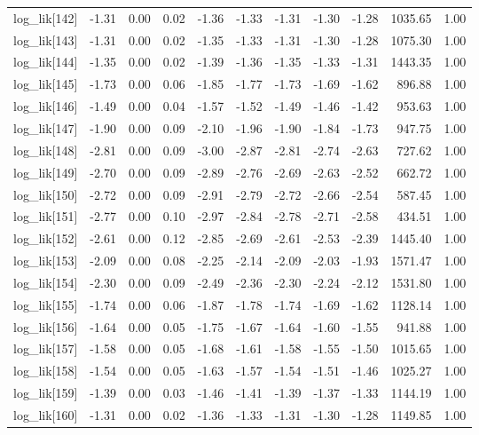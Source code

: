 \begin{table}[ht]
\begin{tabular}{rrrrrrrrrrr}
  log\_lik[142] & -1.31 & 0.00 & 0.02 & -1.36 & -1.33 & -1.31 & -1.30 & -1.28 & 1035.65 & 1.00 \\ 
  log\_lik[143] & -1.31 & 0.00 & 0.02 & -1.35 & -1.33 & -1.31 & -1.30 & -1.28 & 1075.30 & 1.00 \\ 
  log\_lik[144] & -1.35 & 0.00 & 0.02 & -1.39 & -1.36 & -1.35 & -1.33 & -1.31 & 1443.35 & 1.00 \\ 
  log\_lik[145] & -1.73 & 0.00 & 0.06 & -1.85 & -1.77 & -1.73 & -1.69 & -1.62 & 896.88 & 1.00 \\ 
  log\_lik[146] & -1.49 & 0.00 & 0.04 & -1.57 & -1.52 & -1.49 & -1.46 & -1.42 & 953.63 & 1.00 \\ 
  log\_lik[147] & -1.90 & 0.00 & 0.09 & -2.10 & -1.96 & -1.90 & -1.84 & -1.73 & 947.75 & 1.00 \\ 
  log\_lik[148] & -2.81 & 0.00 & 0.09 & -3.00 & -2.87 & -2.81 & -2.74 & -2.63 & 727.62 & 1.00 \\ 
  log\_lik[149] & -2.70 & 0.00 & 0.09 & -2.89 & -2.76 & -2.69 & -2.63 & -2.52 & 662.72 & 1.00 \\ 
  log\_lik[150] & -2.72 & 0.00 & 0.09 & -2.91 & -2.79 & -2.72 & -2.66 & -2.54 & 587.45 & 1.00 \\ 
  log\_lik[151] & -2.77 & 0.00 & 0.10 & -2.97 & -2.84 & -2.78 & -2.71 & -2.58 & 434.51 & 1.00 \\ 
  log\_lik[152] & -2.61 & 0.00 & 0.12 & -2.85 & -2.69 & -2.61 & -2.53 & -2.39 & 1445.40 & 1.00 \\ 
  log\_lik[153] & -2.09 & 0.00 & 0.08 & -2.25 & -2.14 & -2.09 & -2.03 & -1.93 & 1571.47 & 1.00 \\ 
  log\_lik[154] & -2.30 & 0.00 & 0.09 & -2.49 & -2.36 & -2.30 & -2.24 & -2.12 & 1531.80 & 1.00 \\ 
  log\_lik[155] & -1.74 & 0.00 & 0.06 & -1.87 & -1.78 & -1.74 & -1.69 & -1.62 & 1128.14 & 1.00 \\ 
  log\_lik[156] & -1.64 & 0.00 & 0.05 & -1.75 & -1.67 & -1.64 & -1.60 & -1.55 & 941.88 & 1.00 \\ 
  log\_lik[157] & -1.58 & 0.00 & 0.05 & -1.68 & -1.61 & -1.58 & -1.55 & -1.50 & 1015.65 & 1.00 \\ 
  log\_lik[158] & -1.54 & 0.00 & 0.05 & -1.63 & -1.57 & -1.54 & -1.51 & -1.46 & 1025.27 & 1.00 \\ 
  log\_lik[159] & -1.39 & 0.00 & 0.03 & -1.46 & -1.41 & -1.39 & -1.37 & -1.33 & 1144.19 & 1.00 \\ 
  log\_lik[160] & -1.31 & 0.00 & 0.02 & -1.36 & -1.33 & -1.31 & -1.30 & -1.28 & 1149.85 & 1.00 \\ 

\end{tabular}
\end{table}
